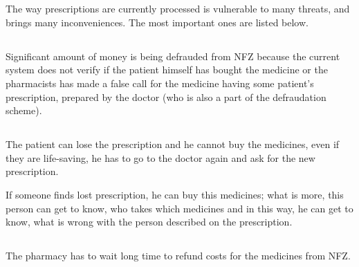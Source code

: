 \chapter{   }

The way prescriptions are currently processed is vulnerable to many threats, and brings many inconveniences. The most important ones are listed below.

\section{}

\subsection{}

Significant amount of money is being defrauded from NFZ because the
current system does not verify if the patient himself has bought the
medicine or the pharmacists has made a false call for the medicine
having some patient's prescription, prepared by the doctor (who is
also a part of the defraudation scheme).

\section{}

\subsection{}
The patient can lose the prescription and he cannot buy the medicines,
even if they are life-saving, he has to go to the doctor again and
ask for the new prescription.

If someone finds lost prescription, he can buy this medicines; what is more, this person
can get to know, who takes which medicines and in this way, he can
get to know, what is wrong with the person described on the prescription.

\section{}

\subsection{}
The pharmacy has to wait long time to refund costs for the medicines
from NFZ.


